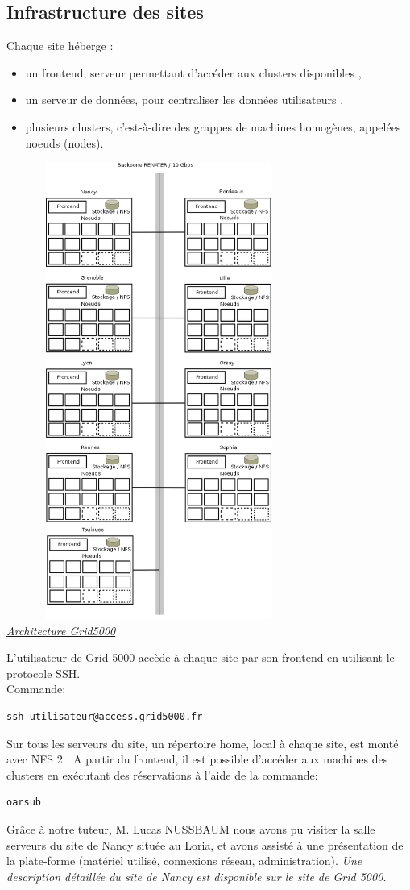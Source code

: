   \subsection{Infrastructure des sites}
Chaque site héberge :
\begin{itemize}
\item un frontend, serveur permettant d'accéder aux clusters disponibles ,
\item un serveur de données, pour centraliser les données utilisateurs ,
\item plusieurs clusters, c'est-à-dire des grappes de machines homogènes, appelées noeuds (nodes).
\end{itemize}
\begin{center}
\includegraphics[width=10cm,height=15cm]{images/g5k1.png}
\\
\underline{\textit{Architecture Grid5000}}
\end{center}
L'utilisateur de Grid 5000 accède à chaque site par son frontend en utilisant le protocole SSH.\\
Commande:
\begin{lstlisting}
ssh utilisateur@access.grid5000.fr
\end{lstlisting}
Sur tous les serveurs du site, un répertoire home, local à chaque site, est monté avec NFS 2 .
A partir du frontend, il est possible d'accéder aux machines des clusters en exécutant des réservations à l'aide de la commande:
\begin{lstlisting}
oarsub
\end{lstlisting}
Grâce à notre tuteur, M. Lucas NUSSBAUM nous avons pu visiter la salle serveurs du site de Nancy située au Loria, 
et avons assisté à une présentation de la plate-forme (matériel utilisé, connexions réseau,
administration).
\newline
\emph{Une description détaillée du site de Nancy est disponible sur le site de Grid 5000.}

